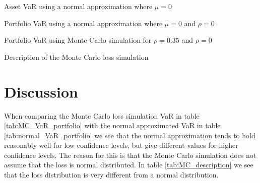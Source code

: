 \documentclass[a4paper]{article}
\begin{document}
\begin{table}[H]
    \caption{Asset VaR using a normal approximation where $\mu = 0$}
    \label{tab:normal_VaR_asset}
\end{table}

\begin{table}[H]
    \caption{Portfolio VaR using a normal approximation where $\mu = 0$ and $\rho = 0$}
    \label{tab:normal_VaR_portfolio}
\end{table}

\begin{table}[H]
    \caption{Portfolio VaR using Monte Carlo simulation for $\rho = 0.35$ and $\rho = 0$}
    \label{tab:MC_VaR_portfolio}
\end{table}

\begin{table}[H]
    \caption{Description of the Monte Carlo loss simulation}
    \label{tab:MC_description}
\end{table}

\section{Discussion}
When comparing the Monte Carlo loss simulation VaR in table \ref{tab:MC_VaR_portfolio} with the normal approximated VaR in table \ref{tab:normal_VaR_portfolio} we see that the normal approximation tends to hold reasonably well for low confidence levels, but give different values for higher confidence levels. The reason for this is that the Monte Carlo simulation does not assume that the loss is normal distributed. In table \ref{tab:MC_description} we see that the loss distribution is very different from a normal distribution.
\end{document}
